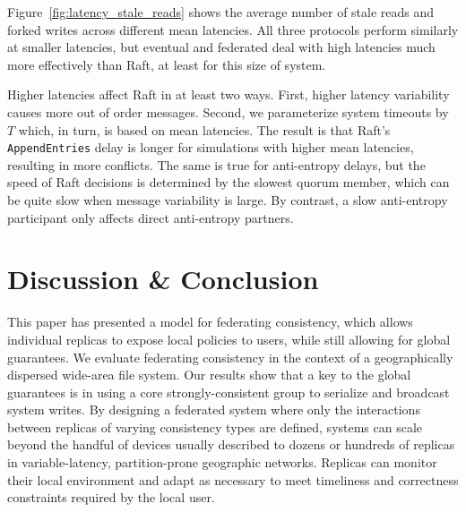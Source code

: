 \documentclass[conference,letterpaper]{IEEEtran}
\begin{document}
Figure~\ref{fig:latency_stale_reads} shows
the average number of stale reads and forked writes across different mean
latencies.
All three protocols perform similarly at smaller latencies, but eventual and
federated deal with high latencies much more effectively than Raft, at least
for this size of system.

Higher latencies affect Raft in at least two ways.
First, higher latency variability causes more out of order messages.
Second, we parameterize system timeouts by $T$ which, in turn, is based on
mean latencies.
The result is that Raft's \texttt{AppendEntries} delay is longer for
simulations with higher mean latencies, resulting in more conflicts.
The same is true for anti-entropy delays, but the speed of Raft decisions is
determined by the slowest quorum member, which can be quite slow when message
variability is large.
By contrast, a slow anti-entropy participant only affects direct anti-entropy
partners.

\section{Discussion \& Conclusion}

This paper has presented a model for federating consistency, which allows individual
replicas to expose local policies to users, while still allowing for global guarantees.
We evaluate federating consistency in the context of a geographically dispersed wide-area
file system.
Our results show that a key to the global guarantees is in using a core
strongly-consistent group to serialize and broadcast system writes.
By designing a federated system where only the interactions between replicas of varying
consistency types are defined, systems can scale beyond the handful of devices usually
described to dozens or hundreds of replicas in variable-latency, partition-prone
geographic networks.
Replicas can monitor their local environment and adapt as necessary to meet timeliness and
correctness constraints required by the local user.



\end{document}

